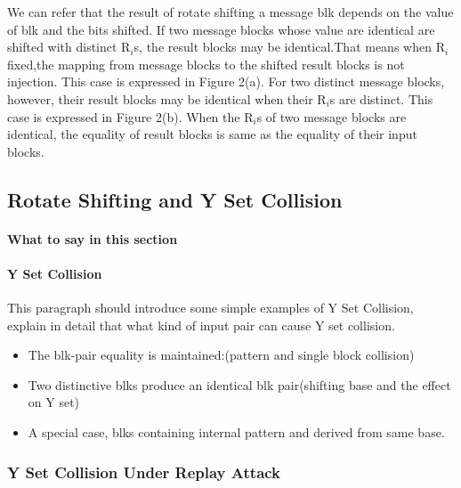 \documentclass{article}
\begin{document}
We can refer that the result of rotate shifting a message blk depends on the
value of blk and the bits shifted.  If two message blocks whose value are
identical are shifted with distinct R$_i$s, the result blocks may be
identical.That means when R$_i$ fixed,the mapping from message blocks to the
shifted result blocks is not injection. This case is expressed in Figure 2(a).
For two distinct message blocks, however, their result blocks may be identical
when their R$_i$s are distinct. This case is expressed in Figure 2(b).  When
the R$_i$s of two message blocks are identical, the equality of result blocks
is same as the equality of their input blocks.

\subsection{Rotate Shifting and Y Set Collision} 
\paragraph{What to say in this section}
\paragraph{Y Set Collision}
This paragraph should introduce some simple examples of Y Set Collision,
explain in detail that what kind of input pair can cause Y set collision.
\begin{itemize} 
	\item The blk-pair equality is maintained:(pattern and single
block collision) 
	\item Two distinctive blks produce an identical blk
pair(shifting base and the effect on Y set) 
	\item A special case, blks
containing internal pattern and derived from same base.  
\end{itemize}
\subsubsection{Y Set Collision Under Replay Attack}
\end{document}
